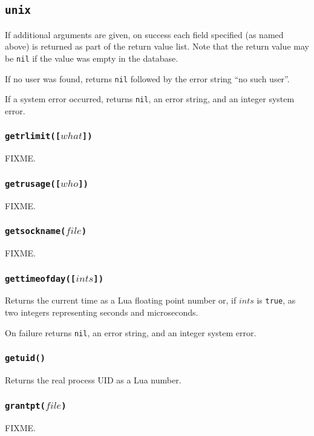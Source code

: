 \documentclass[11pt, oneside]{memoir}
\newcommand*{\true}[0]{\texttt{true}\xspace}
\newcommand*{\nil}[0]{\texttt{nil}\xspace}
\newcommand*{\fn}[1]{\texttt{#1}\xspace}
\newcounter{toccols}
\newenvironment{Module}[1]{
	\subsection{\texttt{#1}}
	\addtocontents{toc}{
		\protect\begin{multicols}{\value{toccols}}
	}
}{
	\addtocontents{toc}{\protect\end{multicols}}
}
\begin{document}
\begin{Module}{unix}
If additional arguments are given, on success each field specified (as named above) is returned as part of the return value list. Note that the return value may be \nil if the value was empty in the database.

If no user was found, returns \nil followed by the error string ``no such user''.

If a system error occurred, returns \nil, an error string, and an integer system error.

\subsubsection[\fn{getrlimit}]{\fn{getrlimit([$what$])}}

FIXME.

\subsubsection[\fn{getrusage}]{\fn{getrusage([$who$])}}

FIXME.

\subsubsection[\fn{getsockname}]{\fn{getsockname($file$)}}

FIXME.

\subsubsection[\fn{gettimeofday}]{\fn{gettimeofday([$ints$])}}

Returns the current time as a Lua floating point number or, if $ints$ is \true, as two integers representing seconds and microseconds.

On failure returns \nil, an error string, and an integer system error.

\subsubsection[\fn{getuid}]{\fn{getuid()}}

Returns the real process UID as a Lua number.

\subsubsection[\fn{grantpt}]{\fn{grantpt($file$)}}

FIXME.


\end{Module}
\end{document}
